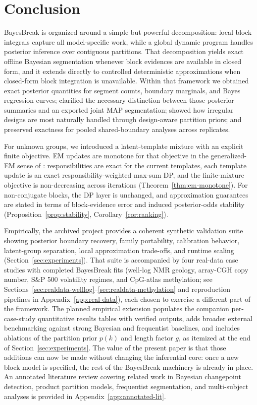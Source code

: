 \section{Conclusion}
\label{sec:conclusion}

BayesBreak is organized around a simple but powerful decomposition: local block integrals capture
all model-specific work, while a global dynamic program handles posterior inference over contiguous
partitions. That decomposition yields exact offline Bayesian segmentation whenever block evidences
are available in closed form, and it extends directly to controlled deterministic approximations
when closed-form block integration is unavailable. Within that framework we obtained exact posterior
quantities for segment counts, boundary marginals, and Bayes regression curves; clarified the
necessary distinction between those posterior summaries and an exported joint MAP segmentation;
showed how irregular designs are most naturally handled through design-aware partition priors;
and preserved exactness for pooled shared-boundary analyses across replicates.

For unknown groups, we introduced a latent-template mixture with an explicit finite objective.
EM updates are monotone for that objective in the generalized-EM sense of
\citet{dempster1977em}: responsibilities are exact for the current templates, each template
update is an exact responsibility-weighted max-sum DP, and the finite-mixture objective is
non-decreasing across iterations (Theorem~\ref{thm:em-monotone}). For non-conjugate blocks, the
DP layer is unchanged, and approximation guarantees are stated in terms of block-evidence error
and induced posterior-odds stability (Proposition~\ref{prop:stability},
Corollary~\ref{cor:ranking}).

Empirically, the archived project provides a coherent synthetic validation suite showing posterior
boundary recovery, family portability, calibration behavior, latent-group separation, local
approximation trade-offs, and runtime scaling (Section~\ref{sec:experiments}). That suite is
accompanied by four real-data case studies with completed BayesBreak fits (well-log NMR geology, array-CGH
copy number, S\&P 500 volatility regimes, and CpG-atlas methylation; see
Sections~\ref{sec:realdata-welllog}--\ref{sec:realdata-methylation} and reproduction pipelines in
Appendix~\ref{app:real-data}), each chosen to exercise a different part of the framework. The planned empirical extension
populates the companion per-case-study quantitative results tables with verified outputs, adds broader external benchmarking against
strong Bayesian and frequentist baselines, and includes ablations of the partition prior $p(k)$ and
length factor $g$, as itemized at the end of Section~\ref{sec:experiments}. The value of the present paper is
that those additions can now be made without changing the inferential core: once a new block
model is specified, the rest of the BayesBreak machinery is already in place. An annotated
literature review covering related work in Bayesian changepoint detection, product partition
models, frequentist segmentation, and multi-subject analyses is provided in
Appendix~\ref{app:annotated-lit}.
